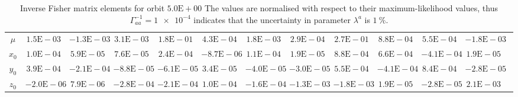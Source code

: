 \begin{sidewaystable}[htbp]
\begin{tabular}{cD{.}{.}{2.5}D{.}{.}{2.5}D{.}{.}{2.5}D{.}{.}{2.5}D{.}{.}{2.5}D{.}{.}{2.5}D{.}{.}{2.5}D{.}{.}{2.5}D{.}{.}{2.5}D{.}{.}{2.5}D{.}{.}{2.5}c}
$\mu$ & $1.5\mathrm{E}-03$ & $-1.3\mathrm{E}-03$ & $3.1\mathrm{E}-03$ & $1.8\mathrm{E}-01$ & $4.3\mathrm{E}-04$ & $1.8\mathrm{E}-03$ & $2.9\mathrm{E}-04$ & $2.7\mathrm{E}-01$ & $8.8\mathrm{E}-04$ & $5.5\mathrm{E}-04$ & $-1.8\mathrm{E}-03$ \\
$x_0$ & $1.0\mathrm{E}-04$ & $5.9\mathrm{E}-05$ & $7.6\mathrm{E}-05$ & $2.4\mathrm{E}-04$ & $-8.7\mathrm{E}-06$ & $1.1\mathrm{E}-04$ & $1.9\mathrm{E}-05$ & $8.8\mathrm{E}-04$ & $6.6\mathrm{E}-04$ & $-4.1\mathrm{E}-04$ & $1.9\mathrm{E}-05$ \\
$y_0$ & $3.9\mathrm{E}-04$ & $-2.1\mathrm{E}-04$ & $-8.8\mathrm{E}-05$ & $-6.1\mathrm{E}-05$ & $3.4\mathrm{E}-05$ & $-4.0\mathrm{E}-05$ & $-3.0\mathrm{E}-05$ & $5.5\mathrm{E}-04$ & $-4.1\mathrm{E}-04$ & $8.4\mathrm{E}-04$ & $-2.8\mathrm{E}-05$ \\
$z_0$ & $-2.0\mathrm{E}-06$ & $7.9\mathrm{E}-06$ & $-2.8\mathrm{E}-04$ & $-2.1\mathrm{E}-04$ & $1.0\mathrm{E}-04$ & $-1.6\mathrm{E}-04$ & $-1.3\mathrm{E}-03$ & $-1.8\mathrm{E}-03$ & $1.9\mathrm{E}-05$ & $-2.8\mathrm{E}-05$ & $2.1\mathrm{E}-03$
\bottomrule
\end{tabular}
\caption{Inverse Fisher matrix elements for orbit $5.0\mathrm{E}+00$ The values are normalised with respect to their maximum-likelihood values, thus $\Gamma^{-1}_{aa} = \num{1e-4}$ indicates that the uncertainty in parameter $\lambda^a$ is $\SI{1}{\percent}$.}
\label{tab:Fisher_5}
\end{sidewaystable}
